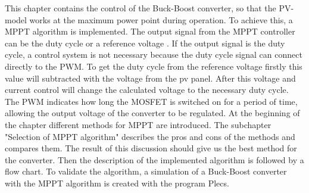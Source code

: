 This chapter contains the control of the Buck-Boost converter, so that the PV-model works at the maximum power point during operation. To achieve this, a MPPT algorithm is implemented. The output signal from the MPPT controller can be the duty cycle or a reference voltage . If the output signal is the duty cycle, a control system is not necessary because the duty cycle signal can connect directly to the PWM. To get the duty cycle from the reference voltage firstly this value will subtracted with the voltage from the pv panel. After this voltage and current control will change the calculated voltage to the necessary duty cycle. The PWM indicates how long the MOSFET is switched on for a period of time, allowing the output voltage of the converter to be regulated.
At the beginning of the chapter different methods for MPPT are introduced. The subchapter "Selection of MPPT algorithm" describes the pros and cons of the methods and compares them. The result of this discussion should give us the best method for the converter. Then the description of the implemented algorithm is followed by a flow chart. To validate the algorithm, a simulation of a Buck-Boost converter with the MPPT algorithm is created with the program Plecs.
